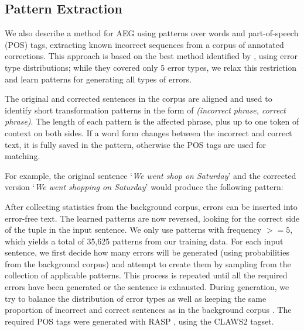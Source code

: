 \documentclass[11pt,letterpaper]{article}
\begin{document}
\subsection{Pattern Extraction}
\label{sec:pat}

We also describe a method for AEG using patterns over words and part-of-speech (POS) tags, extracting known incorrect sequences from a corpus of annotated corrections.
This approach is based on the best method identified by , using error type distributions; while they covered only 5 error types, we relax this restriction and learn patterns for generating all types of errors.%


The original and corrected sentences in the corpus are aligned and used to identify short transformation patterns in the form of \textit{(incorrect phrase, correct phrase)}. The length of each pattern is the affected phrase, plus up to one token of context on both sides. If a word form changes between the incorrect and correct text, it is fully saved in the pattern, otherwise the POS tags are used for matching.

For example, the original sentence `\textit{We went shop on Saturday}' and the corrected version `\textit{We went shopping on Saturday}' would produce the following pattern:
\begin{center}
\end{center}

\noindent After collecting statistics from the background corpus, errors can be inserted into error-free text. The learned patterns are now reversed, looking for the correct side of the tuple in the input sentence. 
We only use patterns with frequency $>= 5$, which yields a total of 35,625 patterns from our training data. 
For each input sentence, we first decide how many errors will be generated (using probabilities from the background corpus) and attempt to create them by sampling from the collection of applicable patterns. This process is repeated until all the required errors have been generated or the sentence is exhausted. During generation, we try to balance the distribution of error types as well as keeping the same proportion of incorrect and correct sentences as in the background corpus \cite{UCAM-CL-TR-895}. The required POS tags were generated with RASP \cite{Briscoe2006}, using the CLAWS2 tagset.%
\end{document}

